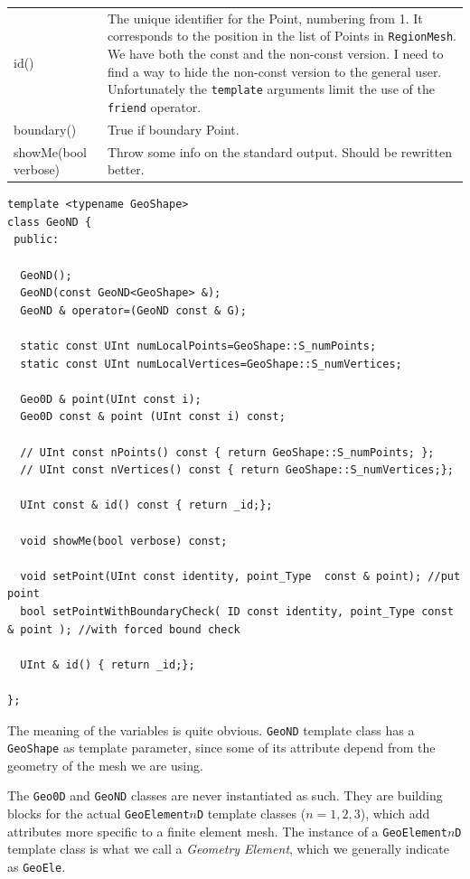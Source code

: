 \begin{tabularx}{\textwidth}{lX} 
\hline 
id() & The unique identifier for the Point, numbering from 1.
  It corresponds to the position in the list of Points in
  \texttt{RegionMesh}. We have both the const and the non-const
  version. I need to find a way to hide the non-const version to the
  general user.  Unfortunately the \texttt{template} arguments limit
  the use of the
  \texttt{friend} operator.\\
  boundary() & True if boundary Point.\\
  showMe(bool verbose) & Throw some info on the standard output. Should be rewritten better.\\
\hline
\end{tabularx}

\begin{verbatim}
template <typename GeoShape>
class GeoND {
 public:
  
  GeoND();
  GeoND(const GeoND<GeoShape> &);
  GeoND & operator=(GeoND const & G); 
  
  static const UInt numLocalPoints=GeoShape::S_numPoints;
  static const UInt numLocalVertices=GeoShape::S_numVertices;
  
  Geo0D & point(UInt const i); 
  Geo0D const & point (UInt const i) const;
  
  // UInt const nPoints() const { return GeoShape::S_numPoints; };
  // UInt const nVertices() const { return GeoShape::S_numVertices;};
  
  UInt const & id() const { return _id;}; 
  
  void showMe(bool verbose) const;
  
  void setPoint(UInt const identity, point_Type  const & point); //put point 
  bool setPointWithBoundaryCheck( ID const identity, point_Type const & point ); //with forced bound check
  
  UInt & id() { return _id;};
  
};
\end{verbatim}
The meaning of the variables is quite obvious. \texttt{GeoND} template class
has a \texttt{GeoShape} as template parameter, since some of its
attribute depend from the geometry of the mesh we are using.

The \texttt{Geo0D} and \texttt{GeoND} classes are never instantiated
as such. They are building blocks for the actual
\texttt{GeoElement$n$D} template classes ($n=1,2,3$), which add
attributes more specific to a finite element mesh. The instance of a
\texttt{GeoElement$n$D} template class is what we call a
\emph{Geometry Element}, which we generally
indicate as \texttt{GeoEle}.

